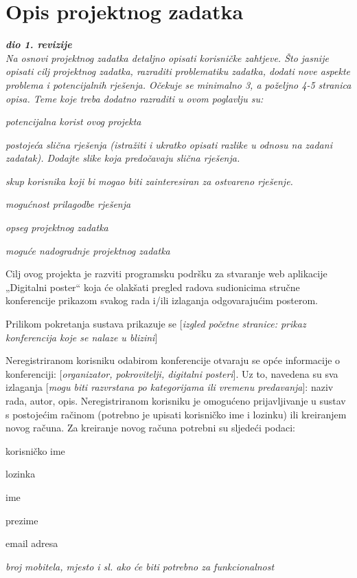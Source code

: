 \chapter{Opis projektnog zadatka}
		
		\textbf{\textit{dio 1. revizije}}\\
		
		\textit{Na osnovi projektnog zadatka detaljno opisati korisničke zahtjeve. Što jasnije opisati cilj projektnog zadatka, razraditi problematiku zadatka, dodati nove aspekte problema i potencijalnih rješenja. Očekuje se minimalno 3, a poželjno 4-5 stranica opisa.	Teme koje treba dodatno razraditi u ovom poglavlju su:}
		\begin{packed_item}
			\item \textit{potencijalna korist ovog projekta}
			\item \textit{postojeća slična rješenja (istražiti i ukratko opisati razlike u odnosu na zadani zadatak). Dodajte slike koja predočavaju slična rješenja.}
			\item \textit{skup korisnika koji bi mogao biti zainteresiran za ostvareno rješenje.}
			\item \textit{mogućnost prilagodbe rješenja }
			\item \textit{opseg projektnog zadatka}
			\item \textit{moguće nadogradnje projektnog zadatka}
		\end{packed_item}
		
		Cilj ovog projekta je razviti programsku podršku za stvaranje web aplikacije „Digitalni poster“ koja će olakšati pregled radova sudionicima stručne konferencije prikazom svakog rada i/ili izlaganja odgovarajućim posterom. 
		
		Prilikom pokretanja sustava prikazuje se [\textit{izgled početne stranice: prikaz konferencija koje se nalaze u blizini}]
		
		Neregistriranom korisniku odabirom konferencije otvaraju se opće informacije o konferenciji: [\textit{organizator, pokrovitelji, digitalni posteri}]. Uz to, navedena su sva izlaganja [\textit{mogu biti razvrstana po kategorijama ili vremenu predavanja}]: naziv rada, autor, opis. Neregistriranom korisniku je omogućeno prijavljivanje u sustav s postojećim račinom (potrebno je upisati korisničko ime i lozinku) ili kreiranjem novog računa. Za kreiranje novog računa potrebni su sljedeći podaci:
		\begin{packed_item}
			\item korisničko ime
			\item lozinka
			\item ime
			\item prezime
			\item email adresa
			\item \textit{broj mobitela, mjesto i sl. ako će biti potrebno za funkcionalnost}
		\end{packed_item}
		
